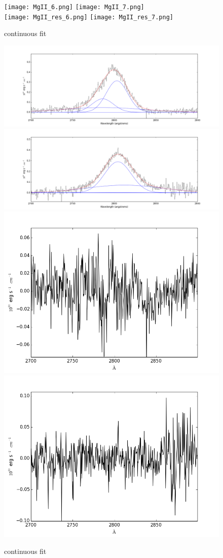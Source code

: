 \documentclass[usenatbib]{mn2e}
\begin{document}
\newpage


\begin{figure}
\begin{center}
\texttt{[image: MgII\_6.png]}
\vspace{5mm}
\texttt{[image: MgII\_7.png]}\\
\texttt{[image: MgII\_res\_6.png]}
\hspace{5mm}
\texttt{[image: MgII\_res\_7.png]}\\
\end{center} 
\caption{continuous fit \label{fig:landscape}}   
\end{figure}

\newpage

\begin{figure}
\begin{center}
\includegraphics[width=0.46\linewidth,angle=0]{MgII_8.png}
\vspace{5mm}
\includegraphics[width=0.49\linewidth,angle=0]{MgII_9.png}\\
\includegraphics[width=0.46\linewidth,angle=0]{MgII_res_8.png}
\hspace{5mm}
\includegraphics[width=0.49\linewidth,angle=0]{MgII_res_9.png}\\
\end{center} 
\caption{continuous fit \label{fig:landscape}}   
\end{figure}
\end{document}
